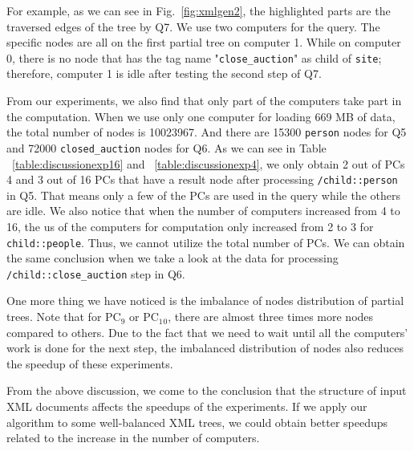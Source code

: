 For example, as we can see in Fig.~\ref{fig:xmlgen2}, the highlighted parts
are the traversed edges of the tree by Q7. We use two computers for the query. 
The specific nodes are all on the first partial tree on computer 1. 
While on computer 0, there is no node that has the tag name "\texttt{close\_auction}" 
as child of \texttt{site}; therefore, computer 1 is idle after testing the second step of Q7. 

From our experiments, we also find that only part of the computers take part in the computation. 
When we use only one computer for loading 669 MB of data, the total number of nodes is 10023967. And there are 
15300 \texttt{person} nodes for Q5 and 72000 \texttt{closed\_auction} nodes for Q6.
As we can see in Table ~\ref{table:discussionexp16} and ~\ref{table:discussionexp4}, 
we only obtain 2 out of PCs 4 and 3 out of 16 PCs that have a result node after
processing \texttt{/child::person} in Q5. That means only a few of the PCs are used in the query while the others are idle. 
We also notice that when the number of computers increased from 4 to 16, 
the us of the computers for computation only increased from 2 to 3 for \texttt{child::people}.
Thus, we cannot utilize the total number of PCs. We can obtain the same 
conclusion when we take a look at the data for processing \texttt{/child::close\_auction} step in Q6. 

One more thing we have noticed is the imbalance of nodes distribution of partial trees. 
Note that for PC$_9$ or PC$_1$$_0$, there are almost three times more nodes compared to others.
Due to the fact that we need to wait until all the computers' work is done for the next step, 
the imbalanced distribution of nodes also reduces the speedup of these experiments. 
 
From the above discussion, we come to the conclusion that the structure 
of input XML documents affects the speedups of the experiments. 
If we apply our algorithm to some well-balanced XML trees, 
we could obtain better speedups related to the increase in the number of computers.


